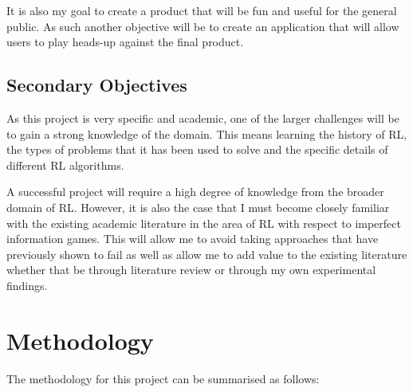 It is also my goal to create a product that will be fun and useful for the general public.
As such another objective will be to create an application that will allow users to play heads-up
against the final product.

\subsection{Secondary Objectives}\label{subsec:secondaryObjectives}
As this project is very specific and academic, one of the larger challenges will be to gain a strong knowledge
of the domain.
This means learning the history of RL, the types of problems that it has been used to solve and the specific details of
different RL algorithms.

A successful project will require a high degree of knowledge from the broader domain of RL. However, it is also the case
that I must become closely familiar with the existing academic literature in the area of RL with respect to imperfect
information games.
This will allow me to avoid taking approaches that have previously shown to fail as well as allow me to add value to
the existing literature whether that be through literature review or through my own experimental findings.


\section{Methodology}\label{sec:methodology}

The methodology for this project can be summarised as follows:

